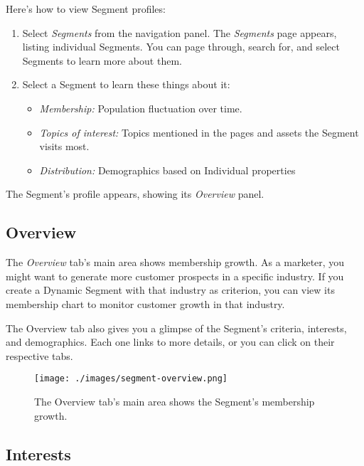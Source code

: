 Here's how to view Segment profiles:

\begin{enumerate}
\def\labelenumi{\arabic{enumi}.}
\item
  Select \emph{Segments} from the navigation panel. The \emph{Segments}
  page appears, listing individual Segments. You can page through,
  search for, and select Segments to learn more about them.
\item
  Select a Segment to learn these things about it:

  \begin{itemize}
  \tightlist
  \item
    \emph{Membership:} Population fluctuation over time.\\
  \item
    \emph{Topics of interest:} Topics mentioned in the pages and assets
    the Segment visits most.
  \item
    \emph{Distribution:} Demographics based on Individual properties
  \end{itemize}
\end{enumerate}

The Segment's profile appears, showing its \emph{Overview} panel.

\subsection{Overview}\label{overview-1}

The \emph{Overview} tab's main area shows membership growth. As a
marketer, you might want to generate more customer prospects in a
specific industry. If you create a Dynamic Segment with that industry as
criterion, you can view its membership chart to monitor customer growth
in that industry.

The Overview tab also gives you a glimpse of the Segment's criteria,
interests, and demographics. Each one links to more details, or you can
click on their respective tabs.

\begin{figure}
\centering
\texttt{[image: ./images/segment-overview.png]}
\caption{The Overview tab's main area shows the Segment's membership
growth.}
\end{figure}

\subsection{Interests}\label{interests-1}

